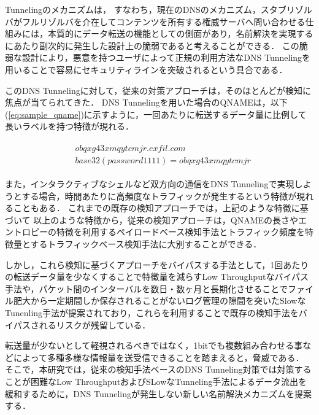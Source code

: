 \documentclass[12pt]{jarticle} %
\begin{document}
Tunnelingのメカニズムは，
すなわち，現在のDNSのメカニズム，スタブリゾルバがフルリゾルバを介在してコンテンツを所有する権威サーバへ問い合わせる仕組みには，本質的にデータ転送の機能としての側面があり，名前解決を実現するにあたり副次的に発生した設計上の脆弱であると考えることができる．
この脆弱な設計により，悪意を持つユーザによって正規の利用方法なDNS Tunnelingを用いることで容易にセキュリティラインを突破されるという具合である．

このDNS Tunnelingに対して，従来の対策アプローチは，そのほとんどが検知に焦点が当てられてきた．
DNS Tunnelingを用いた場合のQNAMEは，以下(\ref{eq:sample_qname})に示すように，一回あたりに転送するデータ量に比例して長いラベルを持つ特徴が現れる．

\begin{eqnarray}
 \label{eq:sample_qname}
 \begin{aligned}
  &obqxg43xmqytcmjr.exfil.com\\
  &base32(password1111) = obqxg43xmqytcmjr
 \end{aligned}
\end{eqnarray}

また，インタラクティブなシェルなど双方向の通信をDNS Tunnelingで実現しようとする場合，時間あたりに高頻度なトラフィックが発生するという特徴が現れることもある．
これまでの既存の検知アプローチでは，上記のような特徴に基づいて
以上のような特徴から，従来の検知アプローチは，QNAMEの長さやエントロピーの特徴を利用するペイロードベース検知手法とトラフィック頻度を特徴量とするトラフィックベース検知手法に大別することができる．

しかし，これら検知に基づくアプローチをバイパスする手法として，1回あたりの転送データ量を少なくすることで特徴量を減らすLow Throughputなバイパス手法や，パケット間のインターバルを数日・数ヶ月と長期化させることでファイル肥大から一定期間しか保存されることがないログ管理の隙間を突いたSlowなTunenling手法が提案されており，これらを利用することで既存の検知手法をバイパスされるリスクが残留している．

転送量が少ないとして軽視されるべきではなく，1bitでも複数組み合わせる事などによって多種多様な情報量を送受信できることを踏まえると，脅威である．
そこで，本研究では，従来の検知手法ベースのDNS Tunneling対策では対策することが困難なLow ThroughputおよびSLowなTunneling手法によるデータ流出を緩和するために，DNS Tunnelingが発生しない新しい名前解決メカニズムを提案する．

\end{document}

